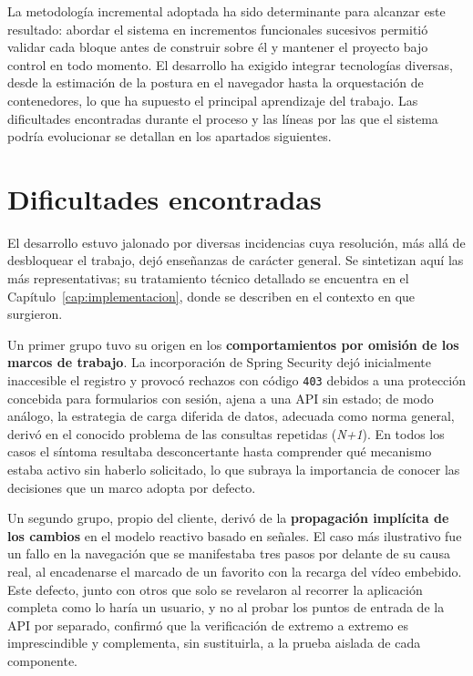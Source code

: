 \documentclass[12pt,a4paper,twoside,openright]{book}
\begin{document}
    La metodología incremental adoptada ha sido determinante para alcanzar este
    resultado: abordar el sistema en incrementos funcionales sucesivos permitió
    validar cada bloque antes de construir sobre él y mantener el proyecto bajo
    control en todo momento. El desarrollo ha exigido integrar tecnologías diversas,
    desde la estimación de la postura en el navegador hasta la orquestación de contenedores,
    lo que ha supuesto el principal aprendizaje del trabajo.
    Las dificultades encontradas durante el proceso y las líneas por las que el
    sistema podría evolucionar se detallan en los apartados siguientes.

    \section{Dificultades encontradas}

    El desarrollo estuvo jalonado por diversas incidencias cuya resolución, más
    allá de desbloquear el trabajo, dejó enseñanzas de carácter general. Se
    sintetizan aquí las más representativas; su tratamiento técnico detallado se
    encuentra en el Capítulo~\ref{cap:implementacion}, donde se describen en el
    contexto en que surgieron.

    Un primer grupo tuvo su origen en los \textbf{comportamientos por omisión de
    los marcos de trabajo}. La incorporación de Spring Security dejó inicialmente
    inaccesible el registro y provocó rechazos con código \texttt{403} debidos a
    una protección concebida para formularios con sesión, ajena a una API sin
    estado; de modo análogo, la estrategia de carga diferida de datos, adecuada
    como norma general, derivó en el conocido problema de las consultas repetidas
    (\textit{N+1}). En todos los casos el síntoma resultaba desconcertante hasta
    comprender qué mecanismo estaba activo sin haberlo solicitado, lo que subraya
    la importancia de conocer las decisiones que un marco adopta por defecto.

    Un segundo grupo, propio del cliente, derivó de la \textbf{propagación
    implícita de los cambios} en el modelo reactivo basado en señales. El caso
    más ilustrativo fue un fallo en la navegación que se manifestaba tres pasos
    por delante de su causa real, al encadenarse el marcado de un favorito con la
    recarga del vídeo embebido. Este defecto, junto con otros que solo se revelaron
    al recorrer la aplicación completa como lo haría un usuario, y no al probar
    los puntos de entrada de la API por separado, confirmó que la
    verificación de extremo a extremo es imprescindible y complementa, sin
    sustituirla, a la prueba aislada de cada componente.
\end{document}

